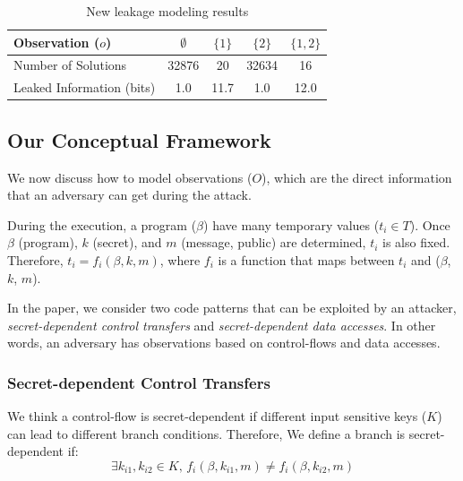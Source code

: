 \begin{table}[ht]
    \centering\small\footnotesize
    \caption{New leakage modeling results}
    \label{shtable2}
    \vspace*{-9pt}
    \begin{tabular}{l|cccc}
        \hline
        Observation ($o$)         & $\emptyset$ & ${\{1\}}$ & ${\{2\}}$ & ${\{1, 2\}}$ \\ \hline
        Number of Solutions       & 32876       & 20        & 32634     & 16           \\ \hline
        Leaked Information (bits) & 1.0         & 11.7      & 1.0       & 12.0         \\
        \hline
    \end{tabular}
\end{table}
\subsection{Our Conceptual Framework}
\label{side-channel:condition}
We now discuss how to model observations ($O$), which are the direct information
that an adversary can get during the attack.

During the execution, a program ($\beta$) have many temporary values ($t_i \in
T$). Once $\beta$ (program), $k$ (secret), and $m$ (message, public) are
determined, $t_i$ is also fixed. Therefore, $ t_i = f_i(\beta, k, m)$, where $f_
i$ is a function that maps between $t_i$ and ($\beta$, $k$, $m$).

In the paper, we consider two code patterns that can be exploited by an attacker,
\emph{secret-dependent control transfers} and \emph{secret-dependent data
accesses}. In other words, an adversary has observations based on control-flows
and data accesses.

\subsubsection{Secret-dependent Control Transfers}
We think a control-flow is secret-dependent if different input sensitive keys
($K$) can lead to different branch conditions. Therefore,
We define a branch is secret-dependent if:
$$\exists k_{i1}, k_{i2} \in K, \,f_i(\beta, k_{i1}, m) \neq f_i(\beta, k_{i2}, m)$$

